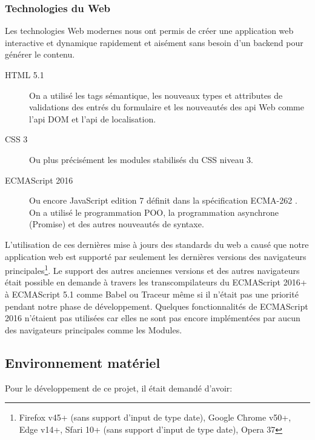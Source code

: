 \subsubsection{Technologies du Web}

Les technologies Web modernes nous ont permis de créer une application web
interactive et dynamique rapidement et aisément sans besoin d'un backend pour
générer le contenu.

\begin{description}
    \item [HTML 5.1] On a utilisé les tags sémantique, les nouveaux types et
        attributes de validations des entrés du formulaire et les nouveautés
        des api Web comme l'api DOM et l'api de localisation.
    \item [CSS 3] Ou plus précisément les modules stabilisés du CSS niveau 3.
    \item [ECMAScript 2016\textregistered] Ou encore JavaScript edition 7
        définit dans la spécification ECMA-262 \cite{ECMA262}. On a utilisé le
        programmation POO, la programmation asynchrone (Promise) et des autres
        nouveautés de syntaxe.
\end{description}

L'utilisation de ces dernières mise à jours des standards du web a causé que
notre application web est supporté par seulement les dernières versions des
navigateurs principales\footnote{Firefox v45+ (sans support d'input de type
date), Google Chrome v50+, Edge v14+, Sfari 10+ (sans support d'input de type
date), Opera 37}. Le support des autres anciennes versions et des autres
navigateurs était possible en demande à travers les transcompilateurs du
ECMAScript 2016+ à ECMAScript 5.1 comme Babel ou Traceur même si il n'était pas
une priorité pendant notre phase de développement. Quelques fonctionnalités de
ECMAScript 2016 n'étaient pas utilisées car elles ne sont pas encore
implémentées par aucun des navigateurs principales comme les Modules.

\subsection{Environnement matériel}

Pour le développement de ce projet, il était demandé d'avoir:

